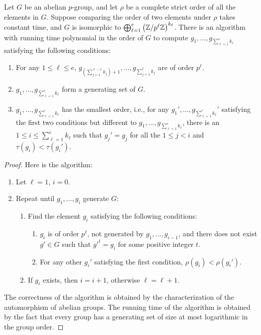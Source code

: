 \begin{lemma}\label{lem:lexical_order}
Let $G$ be an abelian $p$-group, and let $\rho$ be a complete strict order of all the elements in $G$. 
Suppose comparing the order of two elements under $\rho$ takes constant time, and 
$G$ is isomorphic to 
$\bigoplus_{\ell = 1}^{e} \left(\mathbb{Z} / p^{\ell } \mathbb{Z}\right)^{k_\ell}$.
There is an algorithm with running time polynomial in the order of $G$ to compute $g_1, \dots, g_{\sum_{\ell = 1}^e k_\ell}$ satisfying the following conditions:
\begin{enumerate}
	\item For any $1 \leq \ell \leq e$, $g_{(\sum_{j = 1}^{\ell - 1} k_j) + 1}, \dots, g_{\sum_{j = 1}^{\ell} k_j}$ are of order $p^\ell$. 
	\item $g_1, \dots, g_{\sum_{\ell = 1}^e k_\ell}$ form a generating set of $G$. 
	\item $g_1, \dots, g_{\sum_{\ell = 1}^e k_\ell}$ has the smallest order, i.e., for any $g_1', \dots, g_{\sum_{\ell = 1}^e k_\ell}'$ satisfying the first two conditions but different to $g_1, \dots, g_{\sum_{\ell = 1}^e k_\ell}$, there is an $1 \leq i \leq \sum_{\ell = 1}^e k_\ell$ such that $g_j' = g_j$ for all the $1 \leq j < i$ and $\tau(g_i) < \tau(g_i')$.
\end{enumerate}
\end{lemma}
\begin{proof}
Here is the algorithm:
\begin{enumerate}
\item Let $\ell = 1$, $i = 0$.
\item Repeat until $g_1, \dots, g_i$ generate $G$:
\begin{enumerate}
	\item Find the element $g_i$ satisfying the following conditions:
	\begin{enumerate}
		\item $g_i$ is of order $p^\ell$, not generated by $g_1, \dots, g_{i-1}$, and there does not exist $g' \in G$ such that $g'^t = g_i$ for some positive integer $t$.
		\item For any other $g_i'$ satisfying the first condition, $\rho(g_i) < \rho(g_i')$. 
	\end{enumerate}
	\item If $g_i$ exists, then $i = i + 1$, otherwise $\ell = \ell + 1$. 
\end{enumerate} 
\end{enumerate}
The correctness of the algorithm is obtained by the characterization of the automorphism of abelian groups.
The running time of the algorithm is obtained by the fact that every group has a generating set of size at most logarithmic in the group order.
\end{proof}

